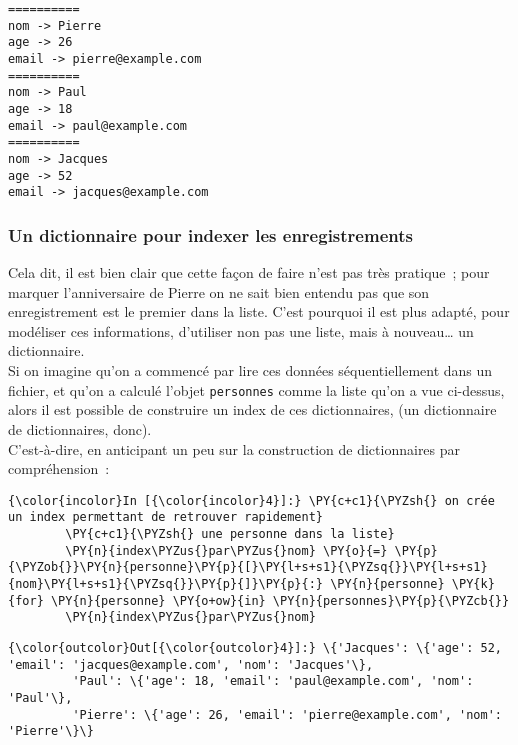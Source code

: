     \begin{Verbatim}[commandchars=\\\{\}]
==========
nom -> Pierre
age -> 26
email -> pierre@example.com
==========
nom -> Paul
age -> 18
email -> paul@example.com
==========
nom -> Jacques
age -> 52
email -> jacques@example.com

    \end{Verbatim}

    \hypertarget{un-dictionnaire-pour-indexer-les-enregistrements}{%
\subsubsection{Un dictionnaire pour indexer les
enregistrements}\label{un-dictionnaire-pour-indexer-les-enregistrements}}

    Cela dit, il est bien clair que cette façon de faire n'est pas très
pratique~; pour marquer l'anniversaire de Pierre on ne sait bien entendu
pas que son enregistrement est le premier dans la liste. C'est pourquoi
il est plus adapté, pour modéliser ces informations, d'utiliser non pas
une liste, mais à nouveau\ldots{} un dictionnaire.\\

Si on imagine qu'on a commencé par lire ces données séquentiellement
dans un fichier, et qu'on a calculé l'objet \texttt{personnes} comme la
liste qu'on a vue ci-dessus, alors il est possible de construire un
index de ces dictionnaires, (un dictionnaire de dictionnaires, donc).\\

C'est-à-dire, en anticipant un peu sur la construction de dictionnaires
par compréhension~:

    \begin{Verbatim}[commandchars=\\\{\}]
{\color{incolor}In [{\color{incolor}4}]:} \PY{c+c1}{\PYZsh{} on crée un index permettant de retrouver rapidement}
        \PY{c+c1}{\PYZsh{} une personne dans la liste}
        \PY{n}{index\PYZus{}par\PYZus{}nom} \PY{o}{=} \PY{p}{\PYZob{}}\PY{n}{personne}\PY{p}{[}\PY{l+s+s1}{\PYZsq{}}\PY{l+s+s1}{nom}\PY{l+s+s1}{\PYZsq{}}\PY{p}{]}\PY{p}{:} \PY{n}{personne} \PY{k}{for} \PY{n}{personne} \PY{o+ow}{in} \PY{n}{personnes}\PY{p}{\PYZcb{}}
        \PY{n}{index\PYZus{}par\PYZus{}nom}
\end{Verbatim}


\begin{Verbatim}[commandchars=\\\{\}]
{\color{outcolor}Out[{\color{outcolor}4}]:} \{'Jacques': \{'age': 52, 'email': 'jacques@example.com', 'nom': 'Jacques'\},
         'Paul': \{'age': 18, 'email': 'paul@example.com', 'nom': 'Paul'\},
         'Pierre': \{'age': 26, 'email': 'pierre@example.com', 'nom': 'Pierre'\}\}
\end{Verbatim}
            
